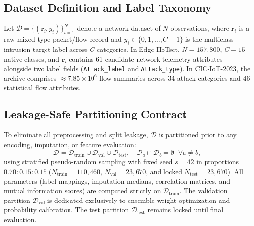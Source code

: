 \documentclass[10pt,journal,twocolumn]{IEEEtran}
\begin{document}
\subsection{Dataset Definition and Label Taxonomy}
Let $\mathcal{D} = \{(\mathbf{r}_i, y_i)\}_{i=1}^N$ denote a network dataset of $N$ observations, where $\mathbf{r}_i$ is a raw mixed-type packet/flow record and $y_i \in \{0, 1, \dots, C-1\}$ is the multiclass intrusion target label across $C$ categories. In Edge-IIoTset, $N=157,800$, $C=15$ native classes, and $\mathbf{r}_i$ contains 61 candidate network telemetry attributes alongside two label fields (\texttt{Attack\_label} and \texttt{Attack\_type}). In CIC-IoT-2023, the archive comprises $\approx 7.85\times 10^6$ flow summaries across 34 attack categories and 46 statistical flow attributes.

\subsection{Leakage-Safe Partitioning Contract}
To eliminate all preprocessing and split leakage, $\mathcal{D}$ is partitioned prior to any encoding, imputation, or feature evaluation:
\begin{equation}
\mathcal{D} = \mathcal{D}_{\text{train}} \cup \mathcal{D}_{\text{val}} \cup \mathcal{D}_{\text{test}}, \quad \mathcal{D}_a \cap \mathcal{D}_b = \emptyset \;\;\forall a \neq b,
\label{eq:split_def}
\end{equation}
using stratified pseudo-random sampling with fixed seed $s=42$ in proportions $0.70 : 0.15 : 0.15$ ($N_{\text{train}}=110,460$, $N_{\text{val}}=23,670$, and locked $N_{\text{test}}=23,670$). All parameters (label mappings, imputation medians, correlation matrices, and mutual information scores) are computed strictly on $\mathcal{D}_{\text{train}}$. The validation partition $\mathcal{D}_{\text{val}}$ is dedicated exclusively to ensemble weight optimization and probability calibration. The test partition $\mathcal{D}_{\text{test}}$ remains locked until final evaluation.
\end{document}
